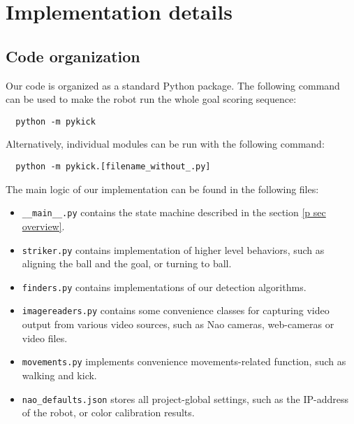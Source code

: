 \chapter{Implementation details}

\section{Code organization}

Our code is organized as a standard Python package. The following command can
be used to make the robot run the whole goal scoring sequence:

\begin{verbatim}
  python -m pykick
\end{verbatim}

Alternatively, individual modules can be run with the following command:

\begin{verbatim}
  python -m pykick.[filename_without_.py]
\end{verbatim}

The main logic of our implementation can be found in the following files:

\begin{itemize}

  \item \verb|__main__.py| contains the state machine described in the section
    \ref{p sec overview}.

  \item \verb|striker.py| contains implementation of higher level behaviors,
    such as aligning the ball and the goal, or turning to ball.

  \item \verb|finders.py| contains implementations of our detection algorithms.

  \item \verb|imagereaders.py| contains some convenience classes for capturing
    video output from various video sources, such as Nao cameras, web-cameras
    or video files.

  \item \verb|movements.py| implements convenience movements-related function,
    such as walking and kick.

  \item \verb|nao_defaults.json| stores all project-global settings, such as
    the IP-address of the robot, or color calibration results.

\end{itemize}

